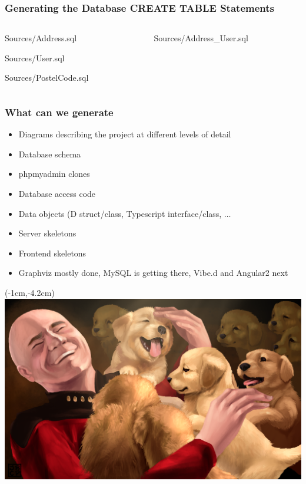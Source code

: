 \documentclass[xelatex,13pt]{beamer}
\begin{document}
\begin{frame}
	\frametitle{Generating the Database CREATE TABLE Statements}
\begin{columns}[T]
\begin{column}{0.49\linewidth}
	
	{Sources/Address.sql}
	
	{Sources/User.sql}
	
	{Sources/PostelCode.sql}
\end{column}
\begin{column}{0.49\linewidth}
	
	{Sources/Address_User.sql}
\end{column}
		
\end{columns}
\end{frame}

\begin{frame}
	\frametitle{What can we generate}
	\begin{itemize}
		\item Diagrams describing the project at different levels of detail
		\item Database schema
		\item phpmyadmin clones
		\item Database access code
		\item Data objects (D struct/class, Typescript interface/class, \(\dots\)
		\item Server skeletons
		\item Frontend skeletons
			\pause
		\item Graphviz mostly done, MySQL is getting there, Vibe.d and
			Angular2 next
	\end{itemize}
\end{frame}

\begin{frame}[plain]
\begin{textblock*}{0cm}(-1cm,-4.2cm)
	\includegraphics[width=1.0\paperwidth]{picardpuppy.png}
\end{textblock*}
\end{frame}
\end{document}
